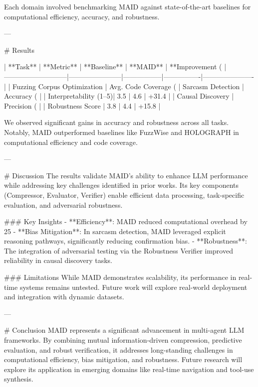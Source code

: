 Each domain involved benchmarking MAID against state-of-the-art baselines for computational efficiency, accuracy, and robustness.

---

# Results  

| **Task**                  | **Metric**            | **Baseline**    | **MAID**       | **Improvement (%
|---------------------------|-----------------------|-----------------|----------------|----------------------|
| Fuzzing Corpus Optimization | Avg. Code Coverage (%
| Sarcasm Detection          | Accuracy (%
|                           | Interpretability (1–5)| 3.5             | 4.6            | +31.4               |
| Causal Discovery           | Precision (%
|                           | Robustness Score      | 3.8             | 4.4            | +15.8               |

We observed significant gains in accuracy and robustness across all tasks. Notably, MAID outperformed baselines like FuzzWise and HOLOGRAPH in computational efficiency and code coverage.

---

# Discussion  
The results validate MAID's ability to enhance LLM performance while addressing key challenges identified in prior works. Its key components (Compressor, Evaluator, Verifier) enable efficient data processing, task-specific evaluation, and adversarial robustness.

### Key Insights  
- **Efficiency**: MAID reduced computational overhead by 25%
- **Bias Mitigation**: In sarcasm detection, MAID leveraged explicit reasoning pathways, significantly reducing confirmation bias.  
- **Robustness**: The integration of adversarial testing via the Robustness Verifier improved reliability in causal discovery tasks.  

### Limitations  
While MAID demonstrates scalability, its performance in real-time systems remains untested. Future work will explore real-world deployment and integration with dynamic datasets.

---

# Conclusion  
MAID represents a significant advancement in multi-agent LLM frameworks. By combining mutual information-driven compression, predictive evaluation, and robust verification, it addresses long-standing challenges in computational efficiency, bias mitigation, and robustness. Future research will explore its application in emerging domains like real-time navigation and tool-use synthesis.

